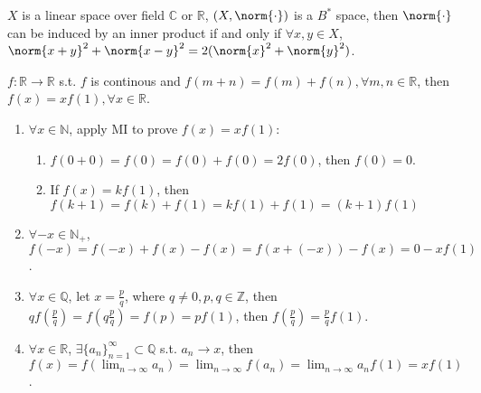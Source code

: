 \documentclass{ctexart}
\begin{document}
\iffalse
\begin{problem}
    $X$ is a linear space over field $\mathbb{C}$ or $\mathbb{R}$, $(X,\norm{\cdot})$ is a $B^*$ space, then $\norm{\cdot}$ can be induced by an inner product if and only if $\forall x,y\in X$, $\norm{x+y}^2+\norm{x-y}^2=2(\norm{x}^2+\norm{y}^2)$.
\end{problem}
\begin{lemma}\label{lem:1}
    $f:\mathbb{R}\to \mathbb{R}$ s.t. $f$ is continous and $f(m+n)=f(m)+f(n),\forall m,n\in \mathbb{R}$, then $f(x)=xf(1),\forall x\in \mathbb{R}$.
\end{lemma}
\begin{solution}
    \begin{enumerate}
        \item $\forall x\in \mathbb{N}$, apply MI to prove $f(x)=xf(1)$:
        \begin{enumerate}
            \item $f(0+0)=f(0)=f(0)+f(0)=2f(0)$, then $f(0)=0$. 
            \item If $f(x)=kf(1)$, then $f(k+1)=f(k)+f(1)=kf(1)+f(1)=(k+1)f(1)$
        \end{enumerate}
        \item $\forall -x\in \mathbb{N}_+ $, $f(-x)=f(-x)+f(x)-f(x)=f(x+(-x))-f(x)=0-xf(1)$.
        \item $\forall x\in \mathbb{Q}$, let $x=\frac{p}{q}$, where $q\neq 0, p,q\in \mathbb{Z}$, then $qf(\frac{p}{q})=f(q\frac{p}{q})=f(p)=pf(1)$, then $f(\frac{p}{q})=\frac{p}{q}f(1)$.
        \item $\forall x\in \mathbb{R}$, $\exists \{a_n\}_{n=1}^{\infty}\subset \mathbb{Q} $ s.t. $a_n\to x$, then $f(x)=f(\lim_{n\to\infty}a_n)=\lim_{n\to\infty}f(a_n)=\lim_{n\to\infty}a_nf(1)=xf(1)$.
            
        
    \end{enumerate}
\end{solution}
\end{document}

